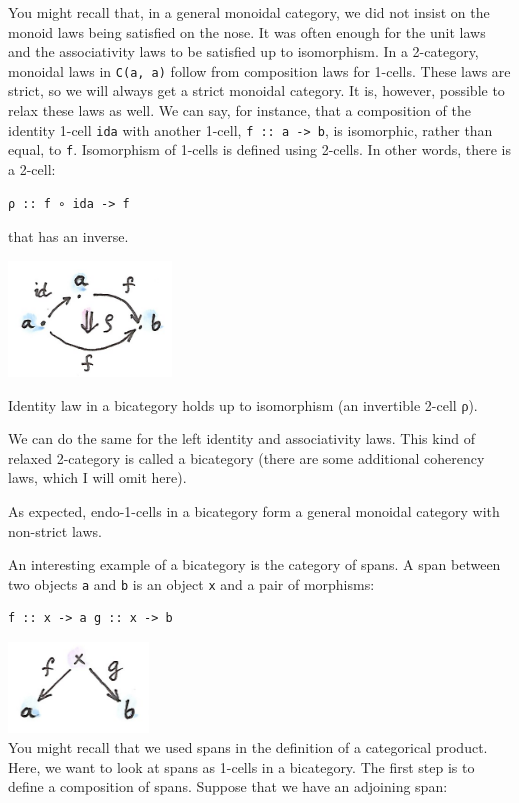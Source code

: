 You might recall that, in a general monoidal category, we did not insist
on the monoid laws being satisfied on the nose. It was often enough for
the unit laws and the associativity laws to be satisfied up to
isomorphism. In a 2-category, monoidal laws in \texttt{C(a,\ a)} follow
from composition laws for 1-cells. These laws are strict, so we will
always get a strict monoidal category. It is, however, possible to relax
these laws as well. We can say, for instance, that a composition of the
identity 1-cell \texttt{ida} with another 1-cell,
\texttt{f\ ::\ a\ -\textgreater{}\ b}, is isomorphic, rather than equal,
to \texttt{f}. Isomorphism of 1-cells is defined using 2-cells. In other
words, there is a 2-cell:

\begin{verbatim}
ρ :: f ∘ ida -> f
\end{verbatim}

that has an inverse.

\hypertarget{attachment_9107}{}
\includegraphics[width=1.70833in]{images/bicat.png}

Identity law in a bicategory holds up to isomorphism (an invertible
2-cell ρ).

We can do the same for the left identity and associativity laws. This
kind of relaxed 2-category is called a bicategory (there are some
additional coherency laws, which I will omit here).

As expected, endo-1-cells in a bicategory form a general monoidal
category with non-strict laws.

An interesting example of a bicategory is the category of spans. A span
between two objects \texttt{a} and \texttt{b} is an object \texttt{x}
and a pair of morphisms:

\begin{verbatim}
f :: x -> a g :: x -> b
\end{verbatim}

\includegraphics[width=1.46875in]{images/span.png}\\
You might recall that we used spans in the definition of a categorical
product. Here, we want to look at spans as 1-cells in a bicategory. The
first step is to define a composition of spans. Suppose that we have an
adjoining span:

